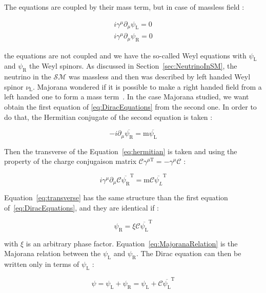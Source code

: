 \documentclass[main.tex]{subfiles}
\begin{document}
\NI The equations are coupled by their mass term, but in case of massless field : 


\begin{gather}
i\gamma^\mu\partial_\mu \psi_\text{L} = \text{0} \nonumber\\[1.0ex]
i\gamma^\mu\partial_\mu \psi_\text{R} = \text{0}
\end{gather}


\NI the equations are not coupled and we have the so-called Weyl equations with $\psi_\text{L}$ and $\psi_\text{R}$ the Weyl spinors. As discussed in Section~\ref{sec:NeutrinoInSM}, the neutrino in the $\mathcal{SM}$ was massless and then was described by left handed Weyl spinor $\nu_\text{L}$. Majorana wondered if it is possible to make a right handed field from a left handed one to form a mass term~\cite{Majorana2008}. In the case Majorana studied, we want obtain the first equation of \ref{eq:DiracEquations} from the second one. In order to do that, the Hermitian conjugate of the second equation is taken : 


\begin{equation}\label{eq:hermitian}
-i\partial_\mu \overline{\psi_\text{R}} = \text{m} \overline{\psi_\text{L}} 
\end{equation}   
 

\NI Then the transverse of the Equation~\ref{eq:hermitian} is taken and using the property of the charge conjugaison matrix $\mathcal{C}\gamma^{\mu\text{T}} = -\gamma^\mu \mathcal{C}$ : 


\begin{equation}\label{eq:transverse}
i\gamma^\mu\partial_\mu\mathcal{C}\overline{\psi_\text{R}}^\text{T} = \text{m} \mathcal{C}\overline{\psi_L}^\text{T}
\end{equation}


\NI Equation~\ref{eq:transverse} has the same structure than the first equation of~\ref{eq:DiracEquations}, and they are identical if : 


\begin{equation}\label{eq:MajoranaRelation}
\psi_\text{R} = \xi \mathcal{C} \overline{\psi_\text{L}}^\text{T}
\end{equation}


\NI with $\xi$ is an arbitrary phase factor. Equation~\ref{eq:MajoranaRelation} is the Majorana relation between the $\psi_\text{L}$ and $\psi_\text{R}$. The Dirac equation can then be written only in terms of $\psi_\text{L}$ :


\begin{equation}
\psi = \psi_\text{L} + \psi_\text{R} = \psi_\text{L} +  \mathcal{C} \overline{\psi_\text{L}}^\text{T}
\end{equation}  
\end{document}
